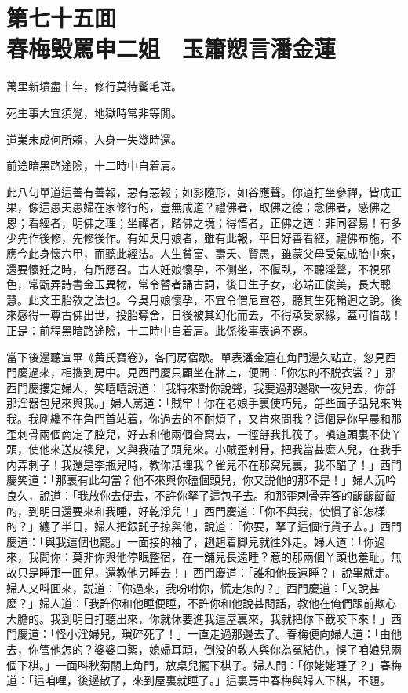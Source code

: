 
\chapter*{第七十五囬　\\春梅毁罵申二姐　玉簫愬言潘金蓮}


\begin{myquote}
萬里新墳盡十年，修行莫待鬢毛斑。

死生事大宜須覺，地獄時常非等閒。

道業未成何所賴，人身一失幾時還。

前途暗黑路途險，十二時中自着肩。
\end{myquote}

此八句單道這善有善報，惡有惡報；如影隨形，如谷應聲。你道打坐參禪，皆成正果，像這愚夫愚婦在家修行的，豈無成道？禮佛者，取佛之德；念佛者，感佛之恩；看經者，明佛之理；坐禪者，踏佛之境；得悟者，正佛之道：非同容易！有多少先作後修，先修後作。有如吳月娘者，雖有此報，平日好善看經，禮佛布施，不應今此身懷六甲，而聽此經法。人生貧富、壽夭、賢愚，雖蒙父母受氣成胎中來，還要懷妊之時，有所應召。古人妊娘懷孕，不側坐，不偃臥，不聽淫聲，不視邪色，常翫弄詩書金玉異物，常令瞽者誦古詞，後日生子女，必端正俊美，長大聰慧。此文王胎敎之法也。今吳月娘懷孕，不宜令僧尼宣卷，聽其生死輪迴之說。後來感得一尊古佛出世，投胎奪舍，日後被其幻化而去，不得承受家緣，蓋可惜哉！正是：前程黑暗路途險，十二時中自着肩。此係後事表過不題。

當下後邊聽宣畢《黄氏寶卷》，各囘房宿歇。單表潘金蓮在角門邊久站立，忽見西門慶過來，相㩦到房中。見西門慶只顧坐在牀上，便問：「你怎的不脱衣裳？」那西門慶摟定婦人，笑嘻嘻說道：「我特來對你說聲，我要過那邊歇一夜兒去，你㧱那淫器包兒來與我。」婦人罵道：「賊牢！你在老娘手裏使巧兒，㧱些面子話兒來哄我。我剛纔不在角門首站着，你過去的不耐煩了，又肯來問我？這個是你早晨和那歪剌骨兩個商定了腔兒，好去和他兩個㒲窝去，一徑㧱我扎筏子。嗔道頭裏不使丫頭，使他來送皮襖兒，又與我磕了頭兒來。小賊歪剌骨，把我當甚麽人兒，在我手内弄剌子！我還是李瓶兒時，教你活埋我？雀兒不在那窝兒裏，我不醋了！」西門慶笑道：「那裏有此勾當？他不來與你磕個頭兒，你又説他的那不是！」婦人沉吟良久，說道：「我放你去便去，不許你拏了這包子去。和那歪剌骨弄答的齷齷齪齪的，到明日還要來和我睡，好乾淨兒！」西門慶道：「你不與我，使慣了卻怎樣的？」纏了半日，婦人把銀託子掠與他，說道：「你要，拏了這個行貨子去。」西門慶道：「與我這個也罷。」一面接的袖了，趔趄着脚兒就徃外走。婦人道：「你過來，我問你：莫非你與他停眠整宿，在一舖兒長遠睡？惹的那兩個丫頭也羞耻。無故只是睡那一囬兒，還教他另睡去！」西門慶道：「誰和他長遠睡？」說畢就走。婦人又呌囬來，説道：「你過來，我吩咐你，慌走怎的？」西門慶道：「又說甚麽？」婦人道：「我許你和他睡便睡，不許你和他說甚閒話，教他在俺們跟前欺心大膽的。我到明日打聽出來，你就休要進我這屋裏來，我就把你下截咬下來！」西門慶道：「怪小淫婦兒，瑣碎死了！」一直走過那邊去了。春梅便向婦人道：「由他去，你管他怎的？婆婆口絮，媳婦耳頑，倒没的敎人與你為冤結仇，悞了咱娘兒兩個下棋。」一面呌秋菊關上角門，放桌兒擺下棋子。婦人問：「你姥姥睡了？」春梅道：「這咱哩，後邊散了，來到屋裏就睡了。」這裏房中春梅與婦人下棋，不題。

